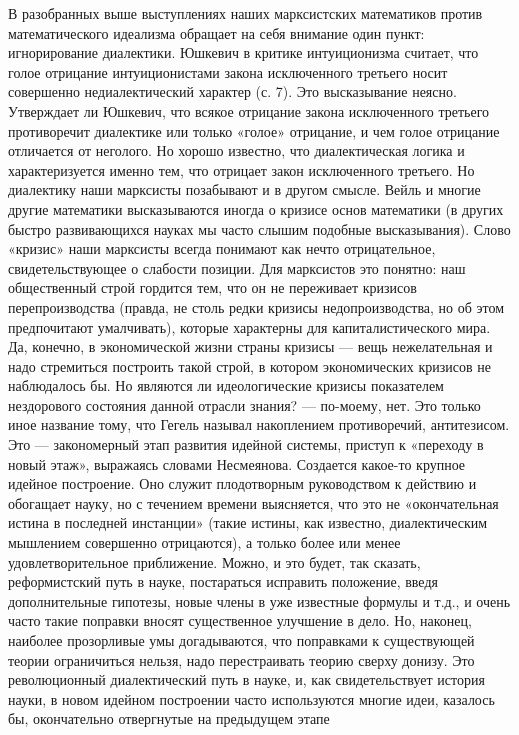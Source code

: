 В разобранных выше выступлениях наших марксистских математиков
против математического идеализма обращает на себя внимание один пункт:
игнорирование диалектики. Юшкевич в критике интуиционизма считает, что
голое отрицание интуиционистами закона исключенного третьего носит
совершенно недиалектический характер (с. 7). Это высказывание неясно.
Утверждает ли Юшкевич, что всякое отрицание закона исключенного
третьего противоречит диалектике или только «голое» отрицание, и чем
голое отрицание отличается от неголого. Но хорошо известно, что
диалектическая логика и характеризуется именно тем, что отрицает закон
исключенного третьего. Но диалектику наши марксисты позабывают и в
другом смысле. Вейль и многие другие математики высказываются иногда о
кризисе основ математики (в других быстро развивающихся науках мы
часто слышим подобные высказывания). Слово «кризис» наши марксисты
всегда понимают как нечто отрицательное, свидетельствующее о слабости
позиции. Для марксистов это понятно: наш общественный строй гордится
тем, что он не переживает кризисов перепроизводства (правда, не столь
редки кризисы недопроизводства, но об этом предпочитают умалчивать),
которые характерны для капиталистического мира. Да, конечно, в
экономической жизни страны кризисы --- вещь нежелательная и надо
стремиться построить такой строй, в котором экономических кризисов не
наблюдалось бы. Но являются ли идеологические кризисы показателем
нездорового состояния данной отрасли знания? --- по-моему, нет. Это
только иное название тому, что Гегель называл накоплением
противоречий, антитезисом. Это --- закономерный этап развития идейной
системы, приступ к «переходу в новый этаж», выражаясь словами
Несмеянова. Создается какое-то крупное идейное построение. Оно служит
плодотворным руководством к действию и обогащает науку, но с течением
времени выясняется, что это не «окончательная истина в последней
инстанции» (такие истины, как известно, диалектическим мышлением
совершенно отрицаются), а только более или менее удовлетворительное
приближение. Можно, и это будет, так сказать, реформистский путь в
науке, постараться исправить положение, введя дополнительные гипотезы,
новые члены в уже известные формулы и т.д., и очень часто такие
поправки вносят существенное улучшение в дело. Но, наконец, наиболее
прозорливые умы догадываются, что поправками к существующей теории
ограничиться нельзя, надо перестраивать теорию сверху донизу. Это
революционный диалектический путь в науке, и, как свидетельствует
история науки, в новом идейном построении часто используются многие
идеи, казалось бы, окончательно отвергнутые на предыдущем этапе
